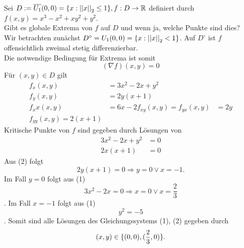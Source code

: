\documentclass[../ana2u.tex]{subfiles}
\begin{document}
\begin{bsp}
    Sei \( D := \overline{U_1}(0,0) = \{x : \left|\left|x\right|\right|_2 \leq 1\}, 
    f:D\rightarrow \mathbb{R} \) definiert durch 
    \( f(x,y) = x^3-x^2+xy^2+y^2 \).\\
    Gibt es globale Extrema von \(f\) auf \(D\) und wenn ja,
    welche Punkte sind dies?\\
    Wir betrachten zunächst \( D^\circ = U_1(0,0) = \{x : \left|\left|x\right|\right|_2 < 1\} \).
    Auf \( D^\circ \) ist \(f\) offensichtlich zweimal stetig differenzierbar.\\
    Die notwendige Bedingung für Extrema ist somit 
    \[ (\nabla f)(x,y) = 0 \]
    Für \((x,y) \in D \) gilt
    \begin{align*}
        f_x(x,y) &= 3x^2-2x+y^2\\
        f_y(x,y) &= 2y(x+1)\\
        f_xx(x,y) &= 6x-2
        f_{xy}(x,y) = f_{yx}(x,y) &= 2y\\
        f_{yy}(x,y) = 2(x+1)
    \end{align*}    
    Kritische Punkte von \(f\) sind gegeben durch 
    Lösungen von 
    \begin{align}
        3x^2 - 2x + y^2 &= 0 \\
        2x(x + 1) &= 0
    \end{align}
    Aus (2) folgt
    \[ 2y(x+1) = 0 \Rightarrow y = 0 \vee x = -1. \]
    Im Fall \(y=0\) folgt aus (1)
    \[ 3x^2 - 2x = 0 \Rightarrow x = 0 \vee x = \frac{2}{3} \].
    Im Fall \(x=-1\) folgt aus (1)
    \[y^2 = -5\].
    Somit sind alle Lösungen des Gleichungssystems (1), (2) 
    gegeben durch 
    \[ (x,y) \in \{ (0,0), (\frac{2}{3}, 0) \}. \]


\end{bsp}
\end{document}
